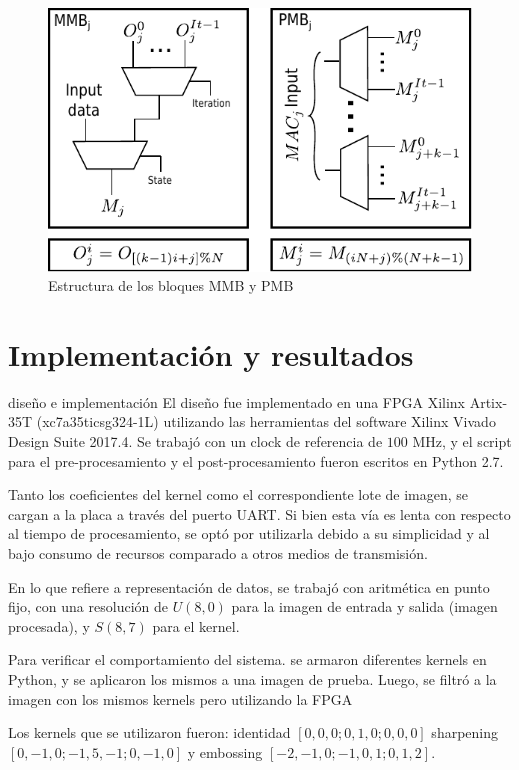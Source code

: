\documentclass[a4paper]{article}
\begin{document}
\bigskip
\bigskip
\begin{figure}[H]
\centering
\includegraphics{muxes_cont}
\caption{ Estructura de los bloques MMB y PMB}
\label{mmu_structure}
\end{figure}


\section{Implementación y resultados}  \label{implementations_sec}
 diseño e implementación
El diseño fue implementado en una FPGA Xilinx Artix-35T (xc7a35ticsg324-1L) utilizando las herramientas del software
Xilinx Vivado Design Suite 2017.4. Se trabajó con un clock de referencia de $100$ MHz, y el script para el pre-procesamiento 
y el post-procesamiento fueron escritos en Python 2.7.

Tanto los coeficientes del kernel como el correspondiente lote de imagen, se cargan a la placa a través
del puerto UART. Si bien esta vía es lenta con respecto al tiempo de procesamiento, se optó por utilizarla
debido a su simplicidad y al bajo consumo de recursos comparado a otros medios de transmisión.

En lo que refiere a representación de datos, se trabajó con aritmética en punto fijo, con una
resolución de $U(8,0)$ para la imagen de entrada y salida (imagen procesada), y $S(8,7)$ para el kernel.


Para verificar el comportamiento del sistema. se armaron diferentes kernels
en Python, y se aplicaron los mismos a una imagen de prueba. Luego, 
se filtró a la imagen con los mismos kernels  pero utilizando la FPGA

Los kernels que se utilizaron fueron: identidad $[0, 0, 0; 0, 1, 0; 0, 0,
0]$ sharpening $[0, -1, 0; -1, 5, -1; 0, -1, 0]$ y embossing $[-2, -1, 0; -1,
0, 1; 0, 1, 2]$.\\
\end{document}
